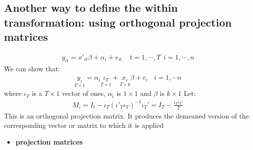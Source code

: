 \documentclass[a4paper,twoside,11pt]{article}
\begin{document}
\subsection{Another way to define the within transformation: using orthogonal projection matrices}
\begin{equation*}
\begin{aligned}
y_{it} = x'_{it} \beta + \alpha_i + e_{it} \ \ \ \ \ t=1,\cdots , T \ \ i =1,\cdots , n
\end{aligned}
\end{equation*}
We can show that:
\begin{equation*}
\begin{aligned}
\underset{T \times 1}{y_i} = \alpha_i \underset{T \times 1}{\iota_T} + \underset{T \times k}{x_i} \beta + e_i \ \ \ \ i=1,\cdots n
\end{aligned}
\end{equation*}
where $\iota_T$ is a $T \times 1$ vector of ones, $\alpha_i$ is $1 \times 1$ and $\beta$ is $k \times 1$ 
\newline
\newline
Let:
\begin{equation*}
\begin{aligned}
M_\iota = I_t -  \iota_T (\iota'_T \iota_T)^{-1} \iota_T' = I_T - \frac{\iota_T \iota_T'}{T}
\end{aligned}
\end{equation*}
This is an orthogonal projection matrix. It produces the demeaned version of the corresponding vector or matrix to which it is applied
\begin{itemize}
    \item \textbf{projection matrices}
\end{itemize}
\end{document}

